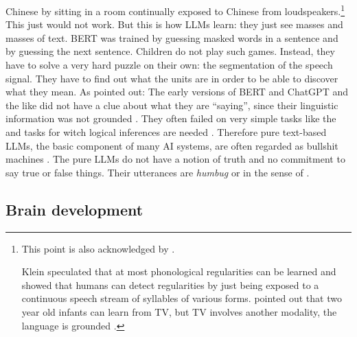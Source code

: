 Chinese by sitting in a room continually exposed to Chinese from loudspeakers.\footnote{%
This point is also acknowledged by \citet[234]{Goldberg2024a}.

Klein speculated that at most phonological regularities can be learned and \citet{NHSA2004a} showed
that humans can detect regularities by just being exposed to a continuous speech stream
of syllables of various forms. \citet[44]{Sogaard2023a} pointed out that two year old infants can learn
from TV, but TV involves another modality, the language is grounded \citep{Rice1983a}.
} This just would not work. But this is how LLMs learn: they just see masses and masses of
text. BERT was trained by guessing masked words in a sentence and by guessing the next
sentence. Children do not play such games. Instead, they have to solve a very hard puzzle on their own:
the segmentation of the speech signal. They have to find out what the units are in order to be able
to discover what they mean. 
%
As \citet{BK2020a} pointed out: The early versions of BERT and ChatGPT and the like did not have a
clue about what they are ``saying'', since their linguistic information was not grounded
\citep{BeulsVanEcke2024a}. They often failed on very simple tasks like the  \citep{Fraser2023a} and tasks for witch logical inferences are needed
\citep{CollinsThorneNewbury2026a}. %
Therefore pure text-based LLMs, the basic component of many AI systems, are often regarded as
bullshit machines \citep{HicksHumphriesSlater2024a}. The pure LLMs do not have a notion of truth and
no commitment to say true or false things. Their utterances are \emph{humbug} or
\emph{} in the sense of \citet{Frankfurt1986a-u}. 



\subsection{Brain development}

